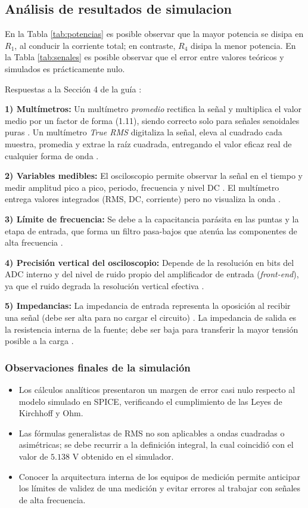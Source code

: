 \documentclass[journal, a4paper]{IEEEtran}
\begin{document}
\subsection{Análisis de resultados de simulacion}
En la Tabla \ref{tab:potencias} es posible observar que la mayor potencia se disipa en $R_1$, al conducir la corriente total; en contraste, $R_4$ disipa la menor potencia. En la Tabla \ref{tab:senales} es posible observar que el error entre valores teóricos y simulados es prácticamente nulo.

Respuestas a la Sección 4 de la guía \cite{guia_practica0}:

\textbf{1) Multímetros:} Un multímetro \emph{promedio} rectifica la señal y multiplica el valor medio por un factor de forma (1.11), siendo correcto solo para señales senoidales puras \cite{fluke_truerms,keysight_truerms}. Un multímetro \emph{True RMS} digitaliza la señal, eleva al cuadrado cada muestra, promedia y extrae la raíz cuadrada, entregando el valor eficaz real de cualquier forma de onda \cite{fluke_truerms}.

\textbf{2) Variables medibles:} El osciloscopio permite observar la señal en el tiempo y medir amplitud pico a pico, periodo, frecuencia y nivel DC \cite{sedra2020}. El multímetro entrega valores integrados (RMS, DC, corriente) pero no visualiza la onda \cite{sedra2020}.

\textbf{3) Límite de frecuencia:} Se debe a la capacitancia parásita en las puntas y la etapa de entrada, que forma un filtro pasa-bajos que atenúa las componentes de alta frecuencia \cite{allaboutcircuits_freqlimit}.

\textbf{4) Precisión vertical del osciloscopio:} Depende de la resolución en bits del ADC interno y del nivel de ruido propio del amplificador de entrada (\emph{front-end}), ya que el ruido degrada la resolución vertical efectiva \cite{keysight_vertacc}.

\textbf{5) Impedancias:} La impedancia de entrada representa la oposición al recibir una señal (debe ser alta para no cargar el circuito) \cite{buadlab_impedance}. La impedancia de salida es la resistencia interna de la fuente; debe ser baja para transferir la mayor tensión posible a la carga \cite{buadlab_impedance}.

\subsubsection{Observaciones finales de la simulación}
\begin{itemize}
    \item Los cálculos analíticos presentaron un margen de error casi nulo respecto al modelo simulado en SPICE, verificando el cumplimiento de las Leyes de Kirchhoff y Ohm.
    \item Las fórmulas generalistas de RMS no son aplicables a ondas cuadradas o asimétricas; se debe recurrir a la definición integral, la cual coincidió con el valor de $5.138\text{ V}$ obtenido en el simulador.
    \item Conocer la arquitectura interna de los equipos de medición permite anticipar los límites de validez de una medición y evitar errores al trabajar con señales de alta frecuencia.
\end{itemize}
\end{document}
